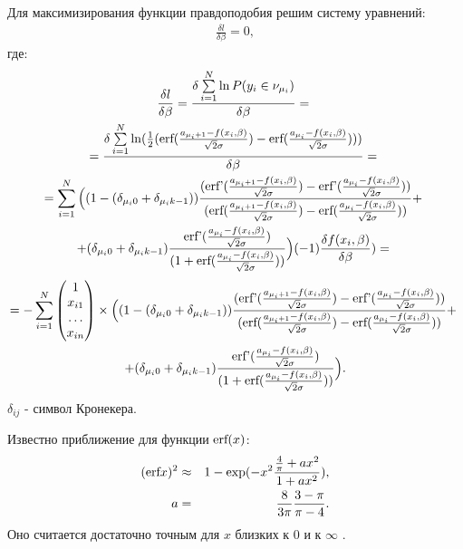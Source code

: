Для максимизирования функции правдоподобия решим систему уравнений:
\begin{eqnarray}
    \label{eq24}\frac{\delta l}{\delta \beta}=0,
\end{eqnarray}
где:
\begin{multline}
    \label{eq27}\frac{\delta l}{\delta \beta}=\frac{\delta \sum\limits_{i=1}^{N}\ln P(y_i\in \nu_{\mu_i})}{\delta \beta}=~\\
    =\frac{\delta \sum\limits_{i=1}^{N} \ln(\frac{1}{2}(\textup{erf}(\frac{a_{\mu_i+1}-f(x_i,\beta)}{\sqrt{2}\sigma})-\textup{erf}(\frac{a_{\mu_i}-f(x_i,\beta)}{\sqrt{2}\sigma})) )         }{\delta \beta}=~\\
    =  \sum\limits_{i=1}^{N}\Big((1-(\delta_{\mu_i 0}+\delta_{\mu_i k-1}))\frac{(\textup{erf'}(\frac{a_{\mu_i+1}-f(x_i,\beta)}{\sqrt{2}\sigma})-\textup{erf'}(\frac{a_{\mu_i}-f(x_i,\beta)}{\sqrt{2}\sigma}))}{ (\textup{erf}(\frac{a_{\mu_i+1}-f(x_i,\beta)}{\sqrt{2}\sigma})-\textup{erf}(\frac{a_{\mu_i}-f(x_i,\beta)}{\sqrt{2}\sigma}))}+~\\
    +(\delta_{\mu_i 0}+\delta_{\mu_i k-1})\frac{\textup{erf'}(\frac{a_{\mu_i}-f(x_i,\beta)}{\sqrt{2}\sigma})}{(1+\textup{erf}(\frac{a_{\mu_i}-f(x_i,\beta)}{\sqrt{2}\sigma}))}\Big)  (-1) \frac{\delta f(x_i,\beta)}{\delta \beta} )=~
\end{multline}
\begin{multline}
    \nonumber 
    =-\sum_{i=1}^{N}\begin{pmatrix}
        1\\
        x_{i1}\\
        \dots\\
        x_{in}
    \end{pmatrix}\times  \Big((1-(\delta_{\mu_i 0}+\delta_{\mu_i k-1}))\frac{(\textup{erf'}(\frac{a_{\mu_i+1}-f(x_i,\beta)}{\sqrt{2}\sigma})-\textup{erf'}(\frac{a_{\mu_i}-f(x_i,\beta)}{\sqrt{2}\sigma}))}{ (\textup{erf}(\frac{a_{\mu_i+1}-f(x_i,\beta)}{\sqrt{2}\sigma})-\textup{erf}(\frac{a_{\mu_i}-f(x_i,\beta)}{\sqrt{2}\sigma}))}+~\\
    +(\delta_{\mu_i 0}+\delta_{\mu_i k-1})\frac{\textup{erf'}(\frac{a_{\mu_i}-f(x_i,\beta)}{\sqrt{2}\sigma})}{(1+\textup{erf}(\frac{a_{\mu_i}-f(x_i,\beta)}{\sqrt{2}\sigma}))}\Big) .
\end{multline}
$\delta_{ij}$ - символ Кронекера.

Известно приближение для функции $\textup{erf}(x)$:
\begin{eqnarray}
    (\textup{erf} x)^2&\approx& 1- \exp(-x^2 \frac{\frac{4}{\pi}+ax^2}{1+ax^2}),\\
    \nonumber a&=&\frac{8}{3\pi}\frac{3-\pi}{\pi -4}.
\end{eqnarray}
Оно считается достаточно точным для $x$ близких к $0$ и к $\infty$ \cite{Winitzki}. \hfill\break

